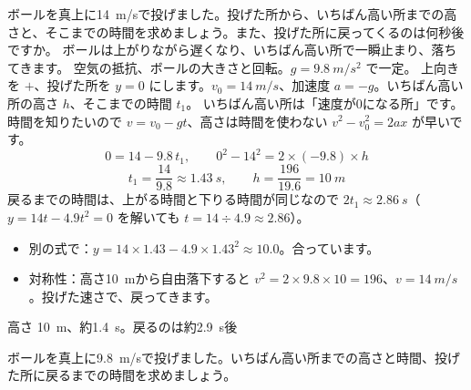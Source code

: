 \begin{phreidai}[ボールを真上に投げる]
\label{ph:力-1:ex4}ボールを真上に\qty{14}{m/s}で投げました。投げた所から、いちばん高い所までの高さと、そこまでの時間を求めましょう。また、投げた所に戻ってくるのは何秒後ですか。
\phbamen
ボールは上がりながら遅くなり、いちばん高い所で一瞬止まり、落ちてきます。
\phmushi
空気の抵抗、ボールの大きさと回転。$g=\qty{9.8}{m/s^2}$ で一定。
\phzu
上向きを $+$、投げた所を $y=0$ にします。$v_0=\qty{14}{m/s}$、加速度 $a=-g$。いちばん高い所の高さ $h$、そこまでの時間 $t_1$。
\phriyu
いちばん高い所は「速度が0になる所」です。時間を知りたいので $v=v_0-gt$、高さは時間を使わない $v^2-v_0^2=2ax$ が早いです。
\phtateru
\[ 0=14-9.8\,t_1,\qquad 0^2-14^2=2\times(-9.8)\times h \]
\phtoku
\[ t_1=\frac{14}{9.8}\approx\qty{1.43}{s},\qquad h=\frac{196}{19.6}=\qty{10}{m} \]
戻るまでの時間は、上がる時間と下りる時間が同じなので $2t_1\approx\qty{2.86}{s}$（$y=14t-4.9t^2=0$ を解いても $t=14\div4.9\approx2.86$）。
\phtashikame
\begin{itemize}[leftmargin=1.2\zw, itemsep=1pt, topsep=1pt, label={\color{bkTheme}●}]
\item 別の式で：$y=14\times1.43-4.9\times1.43^2\approx10.0$。合っています。
\item 対称性：高さ\qty{10}{m}から自由落下すると $v^2=2\times9.8\times10=196$、$v=\qty{14}{m/s}$。投げた速さで、戻ってきます。
\end{itemize}
\kotae 高さ \qty{10}{m}、約\qty{1.4}{s}。戻るのは約\qty{2.9}{s}後
\end{phreidai}
\begin{jibun}
ボールを真上に\qty{9.8}{m/s}で投げました。いちばん高い所までの高さと時間、投げた所に戻るまでの時間を求めましょう。
\end{jibun}

